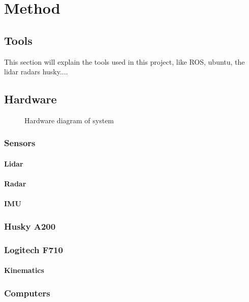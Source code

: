 \chapter{Method}
\section{Tools}
This section will explain the tools used in this project, like ROS, ubuntu, the lidar radars husky....

\section{Hardware}

\begin{figure}[H]
    \centering
    
    \caption{Hardware diagram of system}
    \label{fig:HWdiagram}
\end{figure}
\subsection{Sensors}
\subsubsection{Lidar}

\subsubsection{Radar}
\subsubsection{IMU}
\subsection{Husky A200}
\subsection{Logitech F710}
\subsubsection{Kinematics}
\subsection{Computers}

